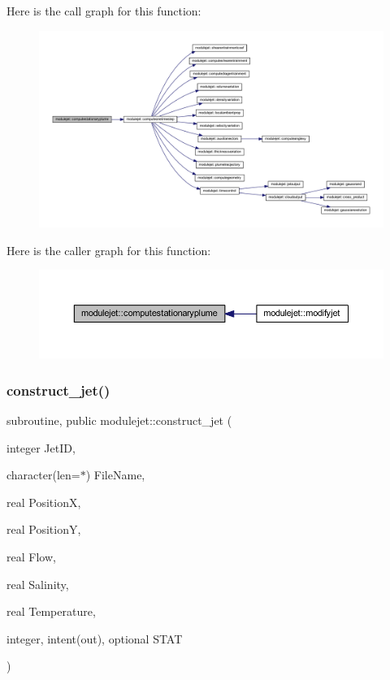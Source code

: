 Here is the call graph for this function\+:\nopagebreak
\begin{figure}[H]
\begin{center}
\leavevmode
\includegraphics[width=350pt]{namespacemodulejet_aa0e9555f7e9aa809220382ec3e33e9a5_cgraph}
\end{center}
\end{figure}
Here is the caller graph for this function\+:\nopagebreak
\begin{figure}[H]
\begin{center}
\leavevmode
\includegraphics[width=350pt]{namespacemodulejet_aa0e9555f7e9aa809220382ec3e33e9a5_icgraph}
\end{center}
\end{figure}
\mbox{\label{namespacemodulejet_abc7edc1751a89ee8c640aaea045a3d01}} 
\subsubsection{\texorpdfstring{construct\+\_\+jet()}{construct\_jet()}}
{\footnotesize\ttfamily subroutine, public modulejet\+::construct\+\_\+jet (\begin{DoxyParamCaption}\item[{integer}]{Jet\+ID,  }\item[{character(len=$\ast$)}]{File\+Name,  }\item[{real}]{PositionX,  }\item[{real}]{PositionY,  }\item[{real}]{Flow,  }\item[{real}]{Salinity,  }\item[{real}]{Temperature,  }\item[{integer, intent(out), optional}]{S\+T\+AT }\end{DoxyParamCaption})}

